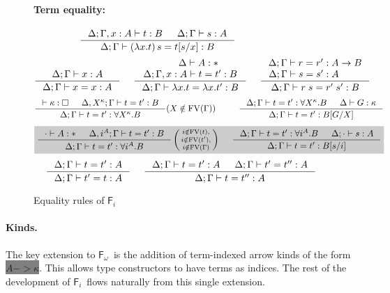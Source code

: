 \documentclass{llncs}
\newcommand{\newFi}[1]{\colorbox{grey}{\ensuremath{#1}}}
\newcommand{\Fi}{\ensuremath{\mathsf{F}_i}}
\newcommand{\Fw}{\ensuremath{\mathsf{F}_\omega}}
\newcommand{\FV}{\mathop{\mathrm{FV}}}
\begin{document}
\begin{figure}
\paragraph{Term equality:} ~~ 
$ \qquad
 ~~~~
   \inference{\Delta;\Gamma,x:A |- t:B & \Delta;\Gamma |- s:A}
             {\Delta;\Gamma |- (\lambda x.t)\,s=t[s/x] : B} $
\[
   \inference{\Delta;\Gamma |- x:A}{\Delta;\Gamma |- x=x:A}
 ~~~~
   \inference{\quad~~ \Delta |- A:* \\ \Delta;\Gamma,x:A |- t=t':B}
             {\Delta;\Gamma |- \lambda x.t = \lambda x.t':B}
 ~~~~
   \inference{\Delta;\Gamma |- r=r':A-> B \\ \Delta;\Gamma |- s=s':A \qquad~}
             {\Delta;\Gamma |- r\;s=r'\;s':B}
\]
\[ \inference{|- \kappa:\square & \Delta, X^\kappa;\Gamma |- t=t' : B}
             {\Delta;\Gamma |- t=t' : \forall X^\kappa.B}
             (X\notin\FV(\Gamma))
 ~~~~ ~~~~
   \inference{ \Delta;\Gamma |- t=t' : \forall X^\kappa.B
             & \Delta |- G:\kappa }
             {\Delta;\Gamma |- t=t' : B[G/X]}
\]
\[ \newFi{
   \inference{\cdot |- A:* & \Delta, i^A;\Gamma |- t=t' : B}
             {\Delta;\Gamma |- t=t' : \forall i^A.B}
   \left(\begin{smallmatrix}
                i\notin\FV(t),\\
                i\notin\FV(t'),\\
                i\notin\FV(\Gamma)\end{smallmatrix}\right)
 ~~~~
   \inference{ \Delta;\Gamma |- t=t' : \forall i^A.B
             & \Delta;\cdot |- s:A}
             {\Delta;\Gamma |- t=t' : B[s/i]} }
\]
\[ \inference{\Delta;\Gamma |- t=t':A}{\Delta;\Gamma |- t'=t:A}
 ~~~~
   \inference{\Delta;\Gamma |- t=t':A & \Delta;\Gamma |- t'=t'':A}
             {\Delta;\Gamma |- t=t'':A}
\]
\caption{Equality rules of \Fi}
\label{fig:eqFi}
\end{figure}


\paragraph{Kinds.}
The key extension to \Fw\ is the addition of term-indexed arrow kinds of
the form \newFi{A -> \kappa}. This allows type constructors to have terms
as indices. The rest of the development of \Fi\ flows naturally from
this single extension.
\end{document}
